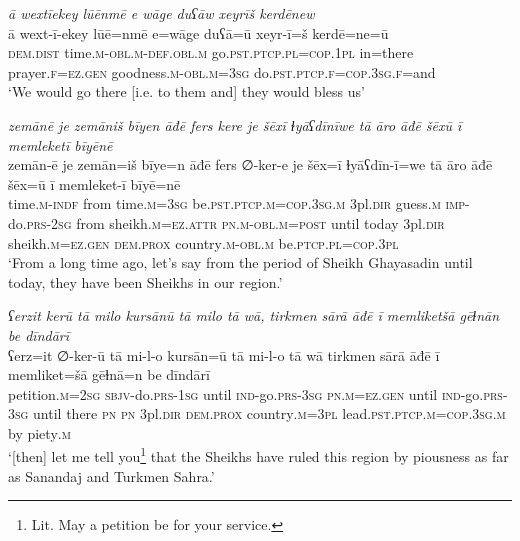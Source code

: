 \ea \label{DG.6}
\textit{ā wextīekey lūēnmē e wāge duʕāw xeyrīš kerdēnew} \\ 
\gll ā wext-ī-ekey lūē=nmē e=wāge duʕā=ū xeyr-ī=š kerdē=ne=ū \\ 
 \textsc{dem.dist} time\textsc{.m}\textsc{-obl}\textsc{.m}\textsc{-def}\textsc{.obl}\textsc{.m} go\textsc{.pst}\textsc{.ptcp}\textsc{.pl}\textsc{=cop}\textsc{.1pl} in=there prayer\textsc{\textsc{.f}}\textsc{=ez}\textsc{.gen} goodness\textsc{.m}\textsc{-obl}\textsc{.m}\textsc{=3sg} do\textsc{.pst}\textsc{.ptcp}\textsc{\textsc{.f}}\textsc{=cop}\textsc{.3sg}\textsc{\textsc{.f}}=and \\ 
\glt `We would go there [i.e. to them and] they would bless us'
\z 
 
\ea \label{DG.8}
\textit{zemānē je zemāniš bīyen āđē fers kere je šēxī ɫyāʕdīnīwe tā āro āđē šēxū ī memleketī bīyēnē} \\ 
\gll zemān-ē je zemān=iš bīye=n āđē fers ∅-ker-e je šēx=ī ɫyāʕdīn-ī=we tā āro āđē šēx=ū ī memleket-ī bīyē=nē \\ 
 time\textsc{.m}\textsc{-indf} from time\textsc{.m}\textsc{=3sg} be\textsc{.pst}\textsc{.ptcp}\textsc{.m}\textsc{=cop}\textsc{.3sg}\textsc{.m} 3pl\textsc{.dir} guess\textsc{.m} \textsc{imp-}do\textsc{.prs}-\textsc{2sg} from sheikh\textsc{.m}\textsc{=ez}.\textsc{attr} \textsc{pn}\textsc{.m}\textsc{-obl}\textsc{.m}\textsc{=\textsc{post}} until today 3pl\textsc{.dir} sheikh\textsc{.m}\textsc{=ez}\textsc{.gen} \textsc{dem.prox} country\textsc{.m}\textsc{-obl}\textsc{.m} be\textsc{.ptcp}\textsc{.pl}\textsc{=cop}\textsc{.3pl} \\ 
\glt `From a long time ago, let’s say from the period of Sheikh Ghayasadin until today, they have been Sheikhs in our region.'
\z 
 
\ea \label{DG.10}
\textit{ʕerzit kerū tā milo kursānū tā milo tā wā, tirkmen sārā āđē ī memliketšā gēɫnān be dīndārī} \\ 
\gll ʕerz=it ∅-ker-ū tā mi-l-o kursān=ū tā mi-l-o tā wā tirkmen sārā āđē ī memliket=šā gēɫnā=n be dīndārī \\ 
 petition\textsc{.m}\textsc{=\textsc{2sg}} \textsc{sbjv-}do\textsc{.prs}\textsc{-1sg} until \textsc{ind-}go\textsc{.prs}\textsc{-3sg} \textsc{pn}\textsc{.m}\textsc{=ez}\textsc{.gen} until \textsc{ind-}go\textsc{.prs}\textsc{-3sg} until there \textsc{pn} \textsc{pn} 3pl\textsc{.dir} \textsc{dem.prox} country\textsc{.m}\textsc{=3pl} lead\textsc{.pst}\textsc{.ptcp}\textsc{.m}\textsc{=cop}\textsc{.3sg}\textsc{.m} by piety\textsc{.m} \\ 
\glt `[then] let me tell you\footnote{Lit. May a petition be for your service.} that the Sheikhs have ruled this region by piousness as far as Sanandaj and Turkmen Sahra.'
\z 
 
